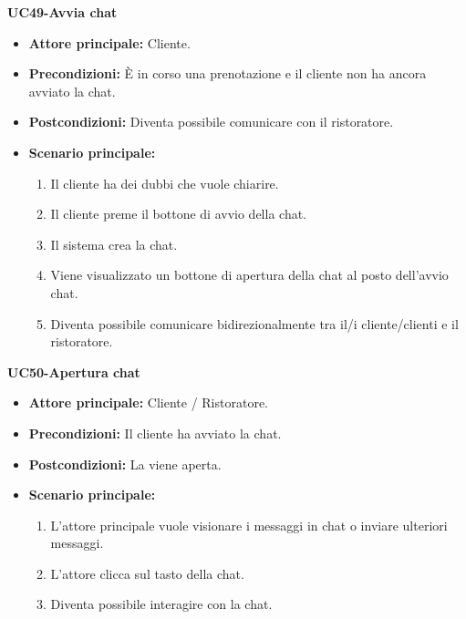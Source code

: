 
\textbf{UC49-Avvia chat}
\begin{itemize}
\item \textbf{Attore principale:} Cliente.
\item \textbf{Precondizioni:} È in corso una prenotazione e il cliente non ha ancora avviato la chat. %
\item \textbf{Postcondizioni:} Diventa possibile comunicare con il ristoratore.
\item \textbf{Scenario principale:}
\begin{enumerate}
    \item Il cliente ha dei dubbi che vuole chiarire.
    \item Il cliente preme il bottone di avvio della chat.
    \item Il sistema crea la chat.
    \item Viene visualizzato un bottone di apertura della chat al posto dell'avvio chat.
    \item Diventa possibile comunicare bidirezionalmente tra il/i cliente/clienti e il ristoratore.
\end{enumerate}
\end{itemize}

\textbf{UC50-Apertura chat}
\begin{itemize}
\item \textbf{Attore principale:} Cliente / Ristoratore.
\item \textbf{Precondizioni:} Il cliente ha avviato la chat.
\item \textbf{Postcondizioni:} La viene aperta. %
\item \textbf{Scenario principale:}
\begin{enumerate}
    \item L'attore principale vuole visionare i messaggi in chat o inviare ulteriori messaggi.
    \item L'attore clicca sul tasto della chat.
    \item Diventa possibile interagire con la chat.
\end{enumerate}
\end{itemize}

